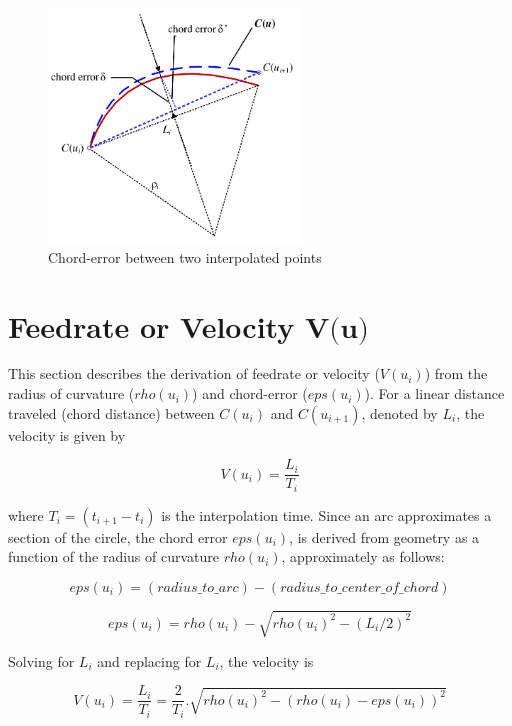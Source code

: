 \begin{figure}
	\centering
	\includegraphics[width=0.60\textwidth]{Images/Chap3/Chord-error-between-2-interpolated-points.png} 
	\caption{Chord-error between two interpolated points}
	\label{Chord-error-between-2-interpolated-points.png}
\end{figure}

\clearpage
\pagebreak


\section{Feedrate or Velocity $ \textbf{V(u)} $}

This section describes the derivation of feedrate or velocity ($V(u_{i})$) from the radius of curvature ($rho(u_{i})$) and chord-error ($eps(u_{i})$). For a linear distance traveled (chord distance) between $C(u_{i})$ and $C(u_{i+1})$, denoted by $L_{i}$, the velocity is given by

\[ V(u_{i}) = \frac {L_{i}} {T_{i}}  \] 

where $T_{i} = (t_{i+1} - t_{i})$  is the interpolation time. Since an arc approximates a section of the circle, the chord error $eps(u_{i})$, is derived from geometry as a function of the radius of curvature $rho(u_{i})$, approximately as follows:

\[ eps(u_{i}) = (radius\_to\_arc) - (radius\_to\_center\_of\_chord) \]

\[ eps(u_{i}) = rho(u_{i}) - \sqrt{{rho(u_{i})}^{2} - {(L_{i}/2)}^{2}}  \]

\vspace{0.5cm}
Solving for $L_{i}$ and replacing for $L_{i}$, the velocity is 

\[ V(u_{i}) = \frac {L_{i}} {T_{i}}   = \frac{2}{T_{i}}.\sqrt{{rho(u_{i})}^{2} - {(rho(u_{i}) - eps(u_{i}))}^{2} } \]   

